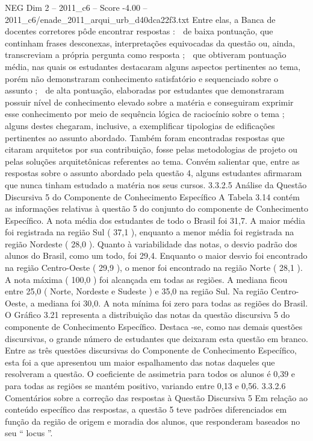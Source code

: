 \begin{textsample}{NEG Dim 2 – 2011\_c6 – Score -4.00 – 2011\_c6/enade\_2011\_arqui\_urb\_d40dca22f3.txt}
Entre elas, a Banca de docentes corretores pôde encontrar respostas :  de baixa pontuação, que continham frases desconexas, interpretações equivocadas da questão ou, ainda, transcreviam a própria pergunta como resposta ;  que obtiveram pontuação média, nas quais os estudantes destacaram alguns aspectos pertinentes ao tema, porém não demonstraram conhecimento satisfatório e sequenciado sobre o assunto ;  de alta pontuação, elaboradas por estudantes que demonstraram possuir nível de conhecimento elevado sobre a matéria e conseguiram exprimir esse conhecimento por meio de sequência lógica de raciocínio sobre o tema ; alguns destes chegaram, inclusive, a exemplificar tipologias de edificações pertinentes ao assunto abordado.
Também foram encontradas respostas que citaram arquitetos por sua contribuição, fosse pelas metodologias de projeto ou pelas soluções arquitetônicas referentes ao tema.
Convém salientar que, entre as respostas sobre o assunto abordado pela questão 4, alguns estudantes afirmaram que nunca tinham estudado a matéria nos seus cursos. 3.3.2.5 Análise da Questão Discursiva 5 do Componente de Conhecimento Específico A Tabela 3.14 contém as informações relativas à questão 5 do conjunto do componente de Conhecimento Específico.
A nota média dos estudantes de todo o Brasil foi 31,7.
A maior média foi registrada na região Sul ( 37,1 ), enquanto a menor média foi registrada na região Nordeste ( 28,0 ).
Quanto à variabilidade das notas, o desvio padrão dos alunos do Brasil, como um todo, foi 29,4.
Enquanto o maior desvio foi encontrado na região Centro-Oeste ( 29,9 ), o menor foi encontrado na região Norte ( 28,1 ).
A nota máxima ( 100,0 ) foi alcançada em todas as regiões.
A mediana ficou entre 25,0 ( Norte, Nordeste e Sudeste ) e 35,0 na região Sul.
Na região Centro-Oeste, a mediana foi 30,0.
A nota mínima foi zero para todas as regiões do Brasil.
O Gráfico 3.21 representa a distribuição das notas da questão discursiva 5 do componente de Conhecimento Específico.
Destaca -se, como nas demais questões discursivas, o grande número de estudantes que deixaram esta questão em branco.
Entre as três questões discursivas do Componente de Conhecimento Específico, esta foi a que apresentou um maior espalhamento das notas daqueles que resolveram a questão.
O coeficiente de assimetria para todos os alunos é 0,39 e para todas as regiões se mantém positivo, variando entre 0,13 e 0,56. 3.3.2.6 Comentários sobre a correção das respostas à Questão Discursiva 5 Em relação ao conteúdo específico das respostas, a questão 5 teve padrões diferenciados em função da região de origem e moradia dos alunos, que responderam baseados no seu “ locus ”.

\end{textsample}
